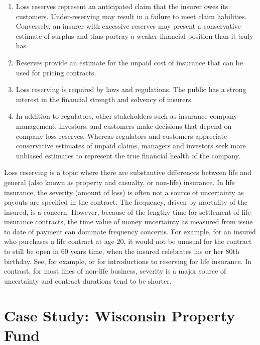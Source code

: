 \documentclass[
]{book}
\providecommand{\tightlist}{%
  \setlength{\itemsep}{0pt}\setlength{\parskip}{0pt}}
\begin{document}
\begin{enumerate}
\def\labelenumi{\arabic{enumi}.}
\tightlist
\item
  Loss reserves represent an anticipated claim that the insurer owes its customers. Under-reserving may result in a failure to meet claim liabilities. Conversely, an insurer with excessive reserves may present a conservative estimate of surplus and thus portray a weaker financial position than it truly has.
\item
  Reserves provide an estimate for the unpaid cost of insurance that can be used for pricing contracts.
\item
  Loss reserving is required by laws and regulations. The public has a strong interest in the financial strength and solvency of insurers.
\item
  In addition to regulators, other stakeholders such as insurance company management, investors, and customers make decisions that depend on company loss reserves. Whereas regulators and customers appreciate conservative estimates of unpaid claims, managers and investors seek more unbiased estimates to represent the true financial health of the company.
\end{enumerate}

Loss reserving is a topic where there are substantive differences between life and general (also known as property and casualty, or non-life) insurance. In life insurance, the severity (amount of loss) is often not a source of uncertainty as payouts are specified in the contract. The frequency, driven by mortality of the insured, is a concern. However, because of the lengthy time for settlement of life insurance contracts, the time value of money uncertainty as measured
from issue to date of payment can dominate frequency concerns. For example, for an insured who purchases a life contract at age 20, it would not be unusual for the contract to still be open in 60 years time, when the insured celebrates his or her 80th birthday. See, for example, \citet{bowers1986actuarial} or \citet{dickson2013actuarial} for introductions to reserving for life insurance. In contrast, for most lines of non-life business, severity is a major source of uncertainty and contract durations tend to be shorter.

\hypertarget{S:LGPIF}{%
\section{Case Study: Wisconsin Property Fund}\label{S:LGPIF}}
\end{document}
